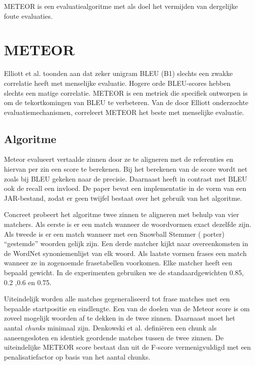 METEOR is een evaluatiealgoritme met als doel het vermijden van dergelijke foute evaluaties.

\section{METEOR}
Elliott et al.  toonden aan dat zeker unigram BLEU (B1) slechts een zwakke correlatie heeft met menselijke evaluatie. Hogere orde BLEU-scores hebben slechts een matige correlatie. METEOR is een metriek die specifiek ontworpen is om de tekortkomingen van BLEU te verbeteren. Van de door Elliott onderzochte evaluatiemechanismen, correleert METEOR het beste met menselijke evaluatie.

\subsection{Algoritme}
Meteor  evalueert vertaalde zinnen door ze te aligneren met de referenties en hiervan per zin een score te berekenen. Bij het berekenen van de score wordt net zoals bij BLEU gekeken naar de precisie. Daarnaast heeft in contrast met BLEU ook de recall een invloed. De paper bevat een implementatie in de vorm van een JAR-bestand, zodat er geen twijfel bestaat over het gebruik van het algoritme.

Concreet probeert het algoritme twee zinnen te aligneren met behulp van vier matchers. Als eerste is er een match wanneer de woordvormen exact dezelfde zijn. Als tweede is er een match wanneer met een Snowball Stemmer ( porter) ``gestemde'' woorden gelijk zijn. Een derde matcher kijkt naar overeenkomsten in de WordNet synoniemenlijst van elk woord.  Als laatste vormen frases een match wanneer ze in zogenoemde frasetabellen  voorkomen.
Elke matcher heeft een bepaald gewicht. In de experimenten gebruiken we de standaardgewichten 0.85, 0.2 ,0.6 en 0.75.

Uiteindelijk worden alle matches gegeneraliseerd tot frase matches met een bepaalde startpositie en eindlengte. Een van de doelen van de Meteor score is om zoveel mogelijk woorden af te dekken in de twee zinnen. Daarnaast moet het aantal \textit{chunks} minimaal zijn. Denkowski et al. defini\"eren een chunk als aaneengesloten en identiek geordende matches tussen de twee zinnen. De uiteindelijke METEOR score bestaat dan uit de F-score vermenigvuldigd met een penalisatiefactor op basis van het aantal chunks.


